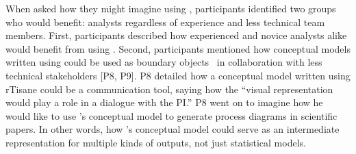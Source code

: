 When asked how they might imagine using \rTisane, participants identified two
groups who would benefit: analysts regardless of experience and less technical
team members. First, participants described how experienced and novice analysts
alike would benefit from using \rTisane [P2, P4, P9, P10, P12]. Second,
participants mentioned how conceptual models written using \rTisane could be
used as boundary objects~\cite{star1989boundaryObjects} in collaboration with less technical
stakeholders [P8, P9]. P8 detailed how a conceptual model written using rTisane
could be a communication tool, saying how the ``visual representation would play
a role in a dialogue with the PI.'' P8 went on to imagine how he would like to
use \rTisane’s conceptual model to generate process diagrams in scientific
papers. In other words, how \rTisane’s conceptual model could serve as an
intermediate representation for multiple kinds of outputs, not just statistical
models. 


\begin{comment}
\theme{Analysts want to use \rTisane iteratively.}
Participants described their typical analysis approach without rTisane as
iterative. During the study, this looked like visualizing the data [P6, 10,
11, 12], assessing correlations between variables [P6, P10] to pick variables
for an initial statistical model, or starting with ``a full model first and
then trim down and compare'' [P11]. In the scaffold condition, analysts engaged
with the connection between their conceptual and statistical models [P2, 5,
12]. For example, P5 refined her conceptual model prior to implementing a
statistical model: ``Conceptual model matters because it gives something to
start with...how all of them have impacts...after have done analysis, look at
R-sq and p-value to interpret significance of these predictors.'' P5 also
grappled with how to interpret the statistical modeling results in light of her
conceptual model, especially since she PICK Background or Prediction as reason.
viewed the purpose of analysis to be able to predict income: ``Really don’t see
how statistical analysis helps us with why…'' She also explained how even though
she had a conceptual model, she did not feel she had the appropriate
background:``[if she had] more of a social science...background knowledge that
we have to dig deeper.'' While P5 could have interpreted her statistical models
in light of the conceptual model she authored, her observation about background
is nevertheless indicative of….
\end{comment}


